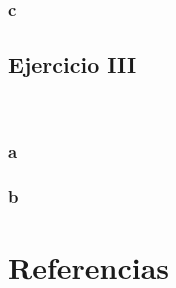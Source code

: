 \documentclass{article}
\begin{document}
\subsubsection*{c}

\subsection*{Ejercicio III}

\

\subsubsection*{a}

\subsubsection*{b}

\section*{Referencias}

\
\end{document}

